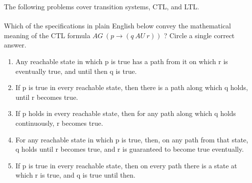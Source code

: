 \documentclass[12pt]{article}
\newenvironment{problem}[2][Problem]{\begin{trivlist}
\item[\hskip \labelsep {\bfseries #1}\hskip \labelsep {\bfseries #2.}]}{\end{trivlist}}
\begin{document}
\begin{problem}{Temporal Logic for Transition Systems} The following problems cover transition systems, CTL, and LTL. \\ \\

Which of the specifications in plain English below convey the mathematical meaning of the CTL formula $AG \ (p \rightarrow (q \ AU \ r))$ ? Circle a single correct answer.


\begin{enumerate}[label=\alph*.]

\item Any reachable state in which p is true has a path from it on which r is eventually true, and until then q is true.

\item If p is true in every reachable state, then there is a path along which q holds, until r becomes true.

\item If p holds in every reachable state, then for any path along which q holds continuously, r becomes true.

\item For any reachable state in which p is true, then, on any path from that state, q holds until r becomes true, and r is guaranteed to become true eventually.

\item If p is true in every reachable state, then on every path there is a state at which r is true, and q is true until then.

\end{enumerate}

\end{problem}

\newpage
\end{document}
